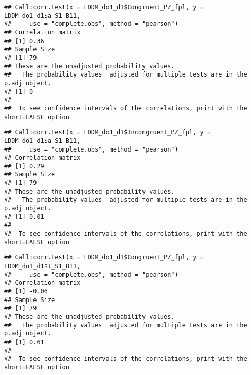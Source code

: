\documentclass[
]{article}
\newenvironment{Shaded}{\begin{snugshade}}{\end{snugshade}}
\newcommand{\AttributeTok}[1]{\textcolor[rgb]{0.77,0.63,0.00}{#1}}
\newcommand{\FunctionTok}[1]{\textcolor[rgb]{0.00,0.00,0.00}{#1}}
\newcommand{\NormalTok}[1]{#1}
\newcommand{\SpecialCharTok}[1]{\textcolor[rgb]{0.00,0.00,0.00}{#1}}
\newcommand{\StringTok}[1]{\textcolor[rgb]{0.31,0.60,0.02}{#1}}
\begin{document}
\begin{verbatim}
## Call:corr.test(x = LDDM_do1_d1$Congruent_PZ_fpl, y = LDDM_do1_d1$a_S1_B11, 
##     use = "complete.obs", method = "pearson")
## Correlation matrix 
## [1] 0.36
## Sample Size 
## [1] 79
## These are the unadjusted probability values.
##   The probability values  adjusted for multiple tests are in the p.adj object. 
## [1] 0
## 
##  To see confidence intervals of the correlations, print with the short=FALSE option
\end{verbatim}

\begin{Shaded}
\end{Shaded}

\begin{verbatim}
## Call:corr.test(x = LDDM_do1_d1$Incongruent_PZ_fpl, y = LDDM_do1_d1$a_S1_B11, 
##     use = "complete.obs", method = "pearson")
## Correlation matrix 
## [1] 0.29
## Sample Size 
## [1] 79
## These are the unadjusted probability values.
##   The probability values  adjusted for multiple tests are in the p.adj object. 
## [1] 0.01
## 
##  To see confidence intervals of the correlations, print with the short=FALSE option
\end{verbatim}

\begin{Shaded}
\end{Shaded}

\begin{verbatim}
## Call:corr.test(x = LDDM_do1_d1$Congruent_PZ_fpl, y = LDDM_do1_d1$t_S1_B11, 
##     use = "complete.obs", method = "pearson")
## Correlation matrix 
## [1] -0.06
## Sample Size 
## [1] 79
## These are the unadjusted probability values.
##   The probability values  adjusted for multiple tests are in the p.adj object. 
## [1] 0.61
## 
##  To see confidence intervals of the correlations, print with the short=FALSE option
\end{verbatim}
\end{document}
